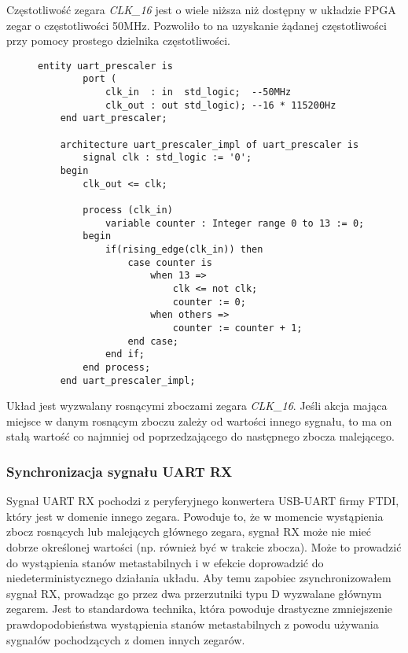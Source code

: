 Częstotliwość zegara \textit{CLK\_16} jest o wiele niższa niż dostępny w układzie FPGA zegar o częstotliwości 50MHz. Pozwoliło to na uzyskanie żądanej częstotliwości przy pomocy prostego dzielnika częstotliwości.

\begin{figure}[!h]
	\begin{lstlisting}[style=vhdl, caption={Dzielnik częstotliwości}, captionpos=b]
	entity uart_prescaler is
		port (
			clk_in  : in  std_logic;  --50MHz
			clk_out : out std_logic); --16 * 115200Hz
	end uart_prescaler;
	
	architecture uart_prescaler_impl of uart_prescaler is
		signal clk : std_logic := '0';
	begin
		clk_out <= clk;
		
		process (clk_in) 
			variable counter : Integer range 0 to 13 := 0;
		begin	
			if(rising_edge(clk_in)) then
				case counter is
					when 13 =>
						clk <= not clk;
						counter := 0;
					when others =>
						counter := counter + 1;
				end case;
			end if;
		end process;
	end uart_prescaler_impl;
	\end{lstlisting}
\end{figure}

Układ jest wyzwalany rosnącymi zboczami zegara \textit{CLK\_16}. Jeśli akcja mająca miejsce w danym rosnącym zboczu zależy od wartości innego sygnału, to ma on stałą wartość co najmniej od poprzedzającego do następnego zbocza malejącego.


\subsubsection{Synchronizacja sygnału UART RX}
\label{uart-sync}
Sygnał UART RX pochodzi z peryferyjnego konwertera USB-UART firmy FTDI, który jest w domenie innego zegara. Powoduje to, że w momencie wystąpienia zbocz rosnących lub malejących głównego zegara, sygnał RX może nie mieć dobrze określonej wartości (np. również być w trakcie zbocza). Może to prowadzić do wystąpienia stanów metastabilnych \cite{altera-metastability} i w efekcie doprowadzić do niedeterministycznego działania układu. Aby temu zapobiec zsynchronizowałem sygnał RX, prowadząc go przez dwa przerzutniki typu D \cite{altera-metastability, 2ff-synchronization} wyzwalane głównym zegarem. Jest to standardowa technika, która powoduje drastyczne zmniejszenie prawdopodobieństwa wystąpienia stanów metastabilnych z powodu używania sygnałów pochodzących z domen innych zegarów.













\newpage